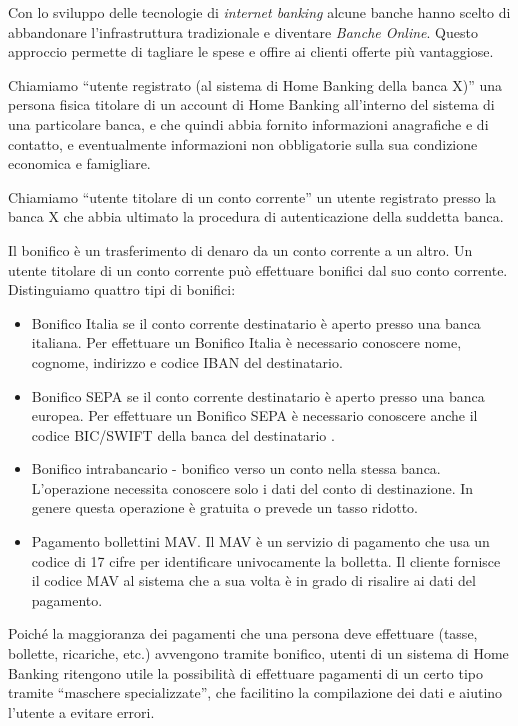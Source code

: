 \documentclass[10pt]{softeng} %
\begin{document}
Con lo sviluppo delle tecnologie di \emph{internet banking} alcune banche hanno scelto di abbandonare l'infrastruttura tradizionale e diventare \emph{Banche Online}.
Questo approccio permette di tagliare le spese e offire ai clienti offerte pi\`u vantaggiose.

Chiamiamo ``utente registrato (al sistema di Home Banking della banca X)'' una persona fisica titolare di un account di Home Banking all'interno del sistema di una particolare banca, e che quindi abbia fornito informazioni anagrafiche e di contatto, e eventualmente informazioni non obbligatorie sulla sua condizione economica e famigliare.

Chiamiamo ``utente titolare di un conto corrente'' un utente registrato presso la banca X che abbia ultimato la procedura di autenticazione della suddetta banca.

Il bonifico \`e un trasferimento di denaro da un conto corrente a un altro.
Un utente titolare di un conto corrente pu\`o effettuare bonifici dal suo conto corrente.
Distinguiamo quattro tipi di bonifici:
\begin{itemize}
	\item Bonifico Italia se il conto corrente destinatario \`e aperto presso una banca italiana.
	Per effettuare un Bonifico Italia \`e necessario conoscere nome, cognome, indirizzo e codice IBAN del destinatario.
	\item Bonifico SEPA se il conto corrente destinatario \`e aperto presso una banca europea. Per effettuare un Bonifico SEPA \`e necessario conoscere anche il codice BIC/SWIFT della banca del destinatario \cite{bonifico_unicredit}.
    \item Bonifico intrabancario - bonifico verso un conto nella stessa banca. L'operazione necessita conoscere solo i dati del conto di destinazione. In genere questa operazione \`e gratuita o prevede un tasso ridotto.
    \item Pagamento bollettini MAV. Il MAV \`e un servizio di pagamento che usa un codice di 17 cifre per identificare univocamente la bolletta. Il cliente fornisce il codice MAV al sistema che a sua volta \`e in grado di risalire ai dati del pagamento.
\end{itemize}
Poich\'e la maggioranza dei pagamenti che una persona deve effettuare (tasse, bollette, ricariche, etc.) avvengono tramite bonifico, utenti di un sistema di Home Banking ritengono utile la possibilit\`a di effettuare pagamenti di un certo tipo tramite ``maschere specializzate'', che facilitino la compilazione dei dati e aiutino l'utente a evitare errori.
\end{document}
